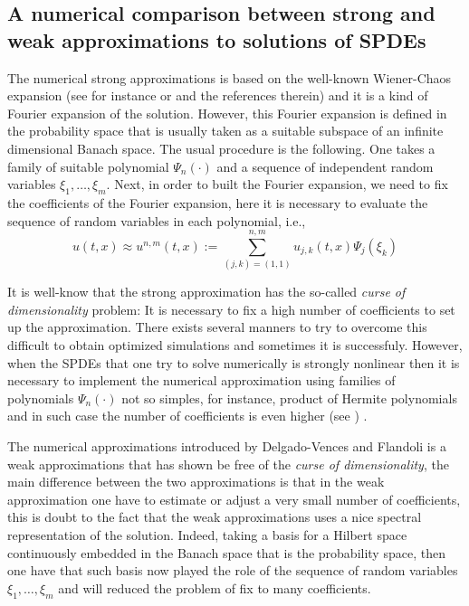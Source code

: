 \documentclass{article}
\numberwithin{equation}{section}
\begin{document}
\subsection{A numerical comparison between strong and weak approximations to solutions of SPDEs}

 The numerical strong approximations is based on the well-known Wiener-Chaos expansion (see for instance \cite{lo-ro} or \cite{ka-zh} and the references therein) and it is a kind of Fourier expansion of the solution. However, this Fourier expansion is defined in the probability space that is usually taken as a suitable subspace of an infinite dimensional Banach space. The usual procedure is the following. One takes a family of suitable polynomial $\Psi_n(\cdot)$ and a sequence of independent random variables $\xi_1,\ldots,\xi_m$. Next, in order to built the Fourier expansion, we need to fix the coefficients of the Fourier expansion, here it is necessary to evaluate the sequence of random variables in each polynomial, i.e.,
 \begin{equation}
  u(t,x) \approx u^{n,m}(t,x):=\sum_{(j,k)=(1,1)}^{n,m} u_{j,k}(t,x) \Psi_j(\xi_k)
 \end{equation}
 
 
It is well-know that the strong approximation has the so-called {\it curse of dimensionality} problem: It is necessary to fix  a high number of coefficients to set up the approximation. There exists several manners to try to overcome this difficult to obtain optimized simulations and sometimes it is successfuly. However, when the SPDEs that one try to solve numerically is strongly nonlinear then it is necessary to implement the numerical approximation using families of polynomials $\Psi_n(\cdot)$ not so simples, for instance, product of Hermite polynomials and in such case the number of coefficients is even higher (see \cite{ka-zh}) .
 
The numerical approximations introduced by Delgado-Vences and Flandoli is a weak approximations that has shown be free of the {\it curse of dimensionality}, the main difference between the two approximations is that in the weak approximation one have to estimate or adjust a very small number of coefficients, this is doubt to the fact that the weak approximations uses a nice spectral representation of the solution. Indeed, taking a basis for a Hilbert space continuously embedded in the Banach space that is the probability space, then one have that such basis now played the role of the  sequence of random variables $\xi_1,\ldots,\xi_m$ and will reduced the problem of fix to many coefficients.
\end{document}
